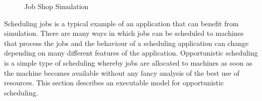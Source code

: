 %
\begin{figure}
\begin{center}





\caption{Job Shop Simulation\label{fig:Job-Shop-Simulation-Steps}}

\end{center}
\end{figure}


Scheduling jobs is a typical example of an application that can benefit
from simulation. There are many ways in which jobs can be scheduled
to machines that process the jobs and the behaviour of a scheduling
application can change depending on many different features of the
application. Opportunistic scheduling is a simple type of scheduling
whereby jobs are allocated to machines as soon as the machine becomes
available without any fancy analysis of the best use of resources.
This section describes an executable model for opportunistic scheduling.

